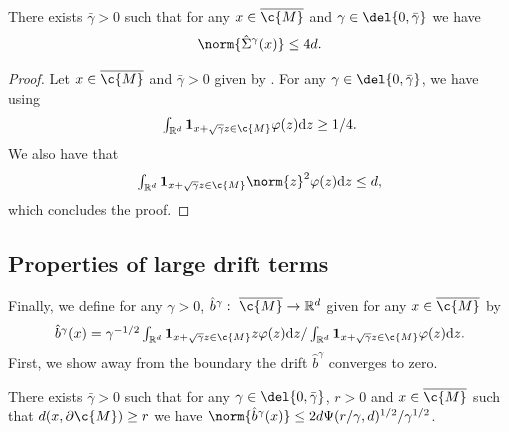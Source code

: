 \begin{proposition}
	\label{prop:condition_d}
	There exists $\bar{\gamma} >0$ such that for any $x \in \cl{\c{M}}$ and $\gamma \in \del{0, \bar{\gamma}}$ we have \begin{equation} \norm{\hat{\Sigma}^\gamma(x)} \leq 4d .
	\end{equation}
\end{proposition}

\begin{proof}
	Let $x \in \cl{\c{M}}$ and $\bar{\gamma} >0$ given by .
	For any $\gamma \in \del{0, \bar{\gamma}}$, we have using  \begin{equation} \textstyle{\int_{\R^d} \bm{1}_{x + \sqrt{\gamma} z \in \c{M}} \varphi(z) \mathrm{d} z \geq 1/4 .
		}
	\end{equation}
	We also have that \begin{equation} \textstyle{ \int_{\R^d} \bm{1}_{x + \sqrt{\gamma} z \in \c{M}} \norm{z}^2 \varphi(z) \mathrm{d} z \leq d , } \end{equation} which concludes the proof.
\end{proof}

\subsection{Properties of large drift terms}
\label{sec:large_drift_properties}

Finally, we define for any $\gamma >0$, $\hat{b}^\gamma: \ \cl{\c{M}} \to \R^d$ given for any $x \in \cl{\c{M}}$ by \begin{equation} \label{eq:intermediate_drift} \textstyle{ \hat{b}^\gamma(x) = \gamma^{-1/2} \int_{\R^d} \bm{1}_{x + \sqrt{\gamma} z \in \c{M}} z \varphi(z) \mathrm{d} z / \int_{\R^d} \bm{1}_{x + \sqrt{\gamma} z \in \c{M}} \varphi(z) \mathrm{d} z.
	}
\end{equation}
First, we show away from the boundary the drift $\hat{b}^\gamma$ converges to zero.

\begin{proposition}
	\label{prop:away_implies_small}
	There exists $\bar{\gamma} >0$ such that for any $\gamma \in \del{0, \bar{\gamma}}$, $r > 0$ and $x \in \cl{\c{M}}$ such that $d(x, \partial \c{M}) \geq r$ we have $\norm{\hat{b}^\gamma(x)} \leq 2d \Psi(r/\gamma,d)^{1/2}/\gamma^{1/2}$.
\end{proposition}

